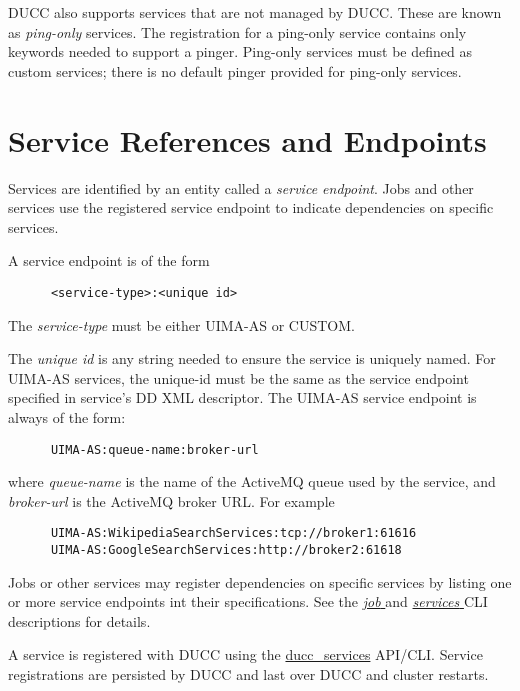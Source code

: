      DUCC also supports services that are not managed by DUCC.  These are known as {\em ping-only}
      services.  The registration for a ping-only service contains only keywords needed to 
      support a pinger.  Ping-only services must be defined as custom services; there is no
      default pinger provided for ping-only services.

      \section{Service References and Endpoints} 
      \label{sec:service.endpoints}
      Services are identified by an entity called a {\em service endpoint}.  Jobs and other
      services use the registered service endpoint to indicate dependencies on specific
      services.

      A service endpoint is of the form 
\begin{verbatim}
      <service-type>:<unique id>
\end{verbatim}
      
      The {\em service-type} must be either UIMA-AS or CUSTOM.
      
      The {\em unique id} is any string needed to ensure the service is
      uniquely named.  For UIMA-AS services, the unique-id must be the same as the
      service endpoint specified in service's DD XML descriptor.  The UIMA-AS
      service endpoint is always of the form:
\begin{verbatim}
      UIMA-AS:queue-name:broker-url
\end{verbatim}
      where {\em queue-name} is the name of the ActiveMQ queue used by the service, and {\em broker-url}
      is the ActiveMQ broker URL.  For example
\begin{verbatim}
      UIMA-AS:WikipediaSearchServices:tcp://broker1:61616
      UIMA-AS:GoogleSearchServices:http://broker2:61618
\end{verbatim}

      Jobs or other services may register dependencies on specific services by listing one or more
      service endpoints int their specifications. See the 
      \hyperref[sec:cli.ducc-submit]{\em job } and 
      \hyperref[sec:cli.ducc-services]{\em services } CLI descriptions for details.
                       
      A service is registered with DUCC using the \hyperref[sec:cli.ducc-services]{ducc\_services}
      API/CLI. Service registrations are persisted by DUCC and last over DUCC and cluster restarts.

